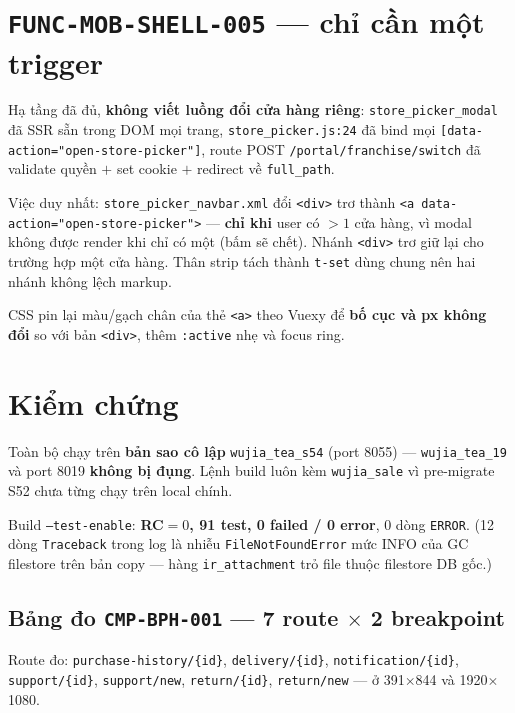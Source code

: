 \section{\texttt{FUNC-MOB-SHELL-005} --- chỉ cần một trigger}

Hạ tầng đã đủ, \textbf{không viết luồng đổi cửa hàng riêng}: \texttt{store\_picker\_modal} đã
SSR sẵn trong DOM mọi trang, \texttt{store\_picker.js:24} đã bind mọi
\texttt{[data-action="open-store-picker"]}, route POST \texttt{/portal/franchise/switch} đã
validate quyền $+$ set cookie $+$ redirect về \texttt{full\_path}.

Việc duy nhất: \texttt{store\_picker\_navbar.xml} đổi \texttt{<div>} trơ thành \texttt{<a
data-action="open-store-picker">} --- \textbf{chỉ khi} user có $>1$ cửa hàng, vì modal không
được render khi chỉ có một (bấm sẽ chết). Nhánh \texttt{<div>} trơ giữ lại cho trường hợp một
cửa hàng. Thân strip tách thành \texttt{t-set} dùng chung nên hai nhánh không lệch markup.

CSS pin lại màu/gạch chân của thẻ \texttt{<a>} theo Vuexy để \textbf{bố cục và px không đổi} so
với bản \texttt{<div>}, thêm \texttt{:active} nhẹ và focus ring.

\section{Kiểm chứng}

Toàn bộ chạy trên \textbf{bản sao cô lập} \texttt{wujia\_tea\_s54} (port 8055) ---
\texttt{wujia\_tea\_19} và port 8019 \textbf{không bị đụng}. Lệnh build luôn kèm
\texttt{wujia\_sale} vì pre-migrate S52 chưa từng chạy trên local chính.

Build \texttt{--test-enable}: \textbf{RC$=0$, 91 test, 0 failed / 0 error}, 0 dòng
\texttt{ERROR}. (12 dòng \texttt{Traceback} trong log là nhiễu \texttt{FileNotFoundError} mức
INFO của GC filestore trên bản copy --- hàng \texttt{ir\_attachment} trỏ file thuộc filestore
DB gốc.)

\subsection{Bảng đo \texttt{CMP-BPH-001} --- 7 route $\times$ 2 breakpoint}

Route đo: \texttt{purchase-history/\{id\}}, \texttt{delivery/\{id\}},
\texttt{notification/\{id\}}, \texttt{support/\{id\}}, \texttt{support/new},
\texttt{return/\{id\}}, \texttt{return/new} --- ở 391$\times$844 và 1920$\times$1080.

